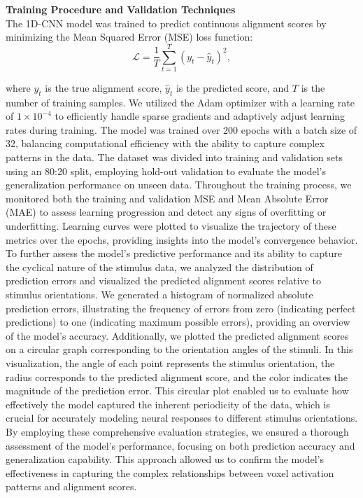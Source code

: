 \documentclass[a4paper]{article}
\begin{document}
\noindent \textbf{Training Procedure and Validation Techniques}\\
The 1D-CNN model was trained to predict continuous alignment scores by minimizing the Mean Squared Error (MSE) loss function:
\begin{equation}
\mathcal{L} = \frac{1}{T} \sum_{t=1}^{T} \left( y_t - \hat{y}_t \right)^2,
\end{equation}


\noindent where \( y_t \) is the true alignment score, \( \hat{y}_t \) is the predicted score, and \( T \) is the number of training samples. We utilized the Adam optimizer with a learning rate of \( 1 \times 10^{-4} \) to efficiently handle sparse gradients and adaptively adjust learning rates during training. The model was trained over 200 epochs with a batch size of 32, balancing computational efficiency with the ability to capture complex patterns in the data. The dataset was divided into training and validation sets using an 80:20 split, employing hold-out validation to evaluate the model's generalization performance on unseen data. Throughout the training process, we monitored both the training and validation MSE and Mean Absolute Error (MAE) to assess learning progression and detect any signs of overfitting or underfitting. Learning curves were plotted to visualize the trajectory of these metrics over the epochs, providing insights into the model's convergence behavior.\\

\noindent To further assess the model's predictive performance and its ability to capture the cyclical nature of the stimulus data, we analyzed the distribution of prediction errors and visualized the predicted alignment scores relative to stimulus orientations. We generated a histogram of normalized absolute prediction errors, illustrating the frequency of errors from zero (indicating perfect predictions) to one (indicating maximum possible errors), providing an overview of the model's accuracy. Additionally, we plotted the predicted alignment scores on a circular graph corresponding to the orientation angles of the stimuli. In this visualization, the angle of each point represents the stimulus orientation, the radius corresponds to the predicted alignment score, and the color indicates the magnitude of the prediction error. This circular plot enabled us to evaluate how effectively the model captured the inherent periodicity of the data, which is crucial for accurately modeling neural responses to different stimulus orientations. By employing these comprehensive evaluation strategies, we ensured a thorough assessment of the model's performance, focusing on both prediction accuracy and generalization capability. This approach allowed us to confirm the model's effectiveness in capturing the complex relationships between voxel activation patterns and alignment scores.
\end{document}
